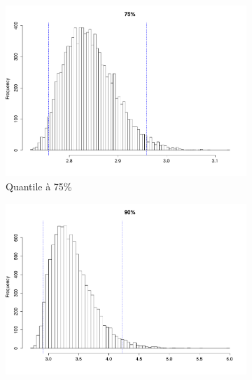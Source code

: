 \documentclass{article}
\renewcommand*{\(}{ \left( }
\renewcommand*{\)}{ \right) }
\begin{document}


\begin{figure}[H]
    \centering
    \begin{subfigure}[t]{0.3\textwidth}
        \includegraphics[width = \linewidth]{img/BootstrapAHill-75-30.pdf}
        \caption{Quantile à 75\%}
        \label{fig:BAH75} %
    \end{subfigure}%
    \begin{subfigure}[t]{0.3\textwidth}
        \includegraphics[width = \linewidth]{img/BootstrapAHill-90-30.pdf}

\end{subfigure}
\end{figure}
\end{document}
